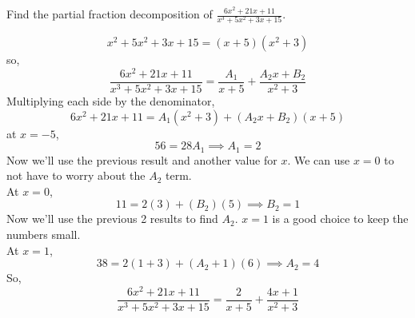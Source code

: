 \begin{example}
	Find the partial fraction decomposition of $\frac{6x^2+21x+11}{x^3+5x^2+3x+15}$.
\end{example}
\begin{equation*}
	x^2+5x^2+3x+15 = (x+5)(x^2+3)
\end{equation*}
so,
\begin{equation*}
	\frac{6x^2+21x+11}{x^3+5x^2+3x+15} = \frac{A_1}{x+5}+\frac{A_2x+B_2}{x^2+3}
\end{equation*}
Multiplying each side by the denominator,
\begin{equation*}
	6x^2+21x+11 = A_1(x^2+3)+(A_2x+B_2)(x+5)
\end{equation*}
at $x=-5$,
\begin{equation*}
	56 = 28A_1 \implies A_1 = 2
\end{equation*}
Now we'll use the previous result and another value for $x$. We can use $x=0$ to not have to worry about the $A_2$ term.\\
At $x=0$,
\begin{equation*}
	11 = 2(3) + (B_2)(5) \implies B_2 = 1
\end{equation*}
Now we'll use the previous 2 results to find $A_2$. $x=1$ is a good choice to keep the numbers small.\\
At $x=1$,
\begin{equation*}
	38 = 2(1+3)+(A_2+1)(6) \implies A_2 = 4
\end{equation*}
So,
\begin{equation*}
	\frac{6x^2+21x+11}{x^3+5x^2+3x+15} = \frac{2}{x+5}+\frac{4x+1}{x^2+3}
\end{equation*}